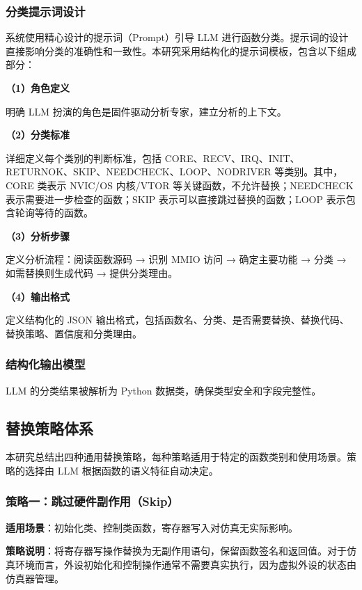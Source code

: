 \subsubsection{分类提示词设计}

系统使用精心设计的提示词（Prompt）引导 LLM 进行函数分类。提示词的设计直接影响分类的准确性和一致性。本研究采用结构化的提示词模板，包含以下组成部分：

\textbf{（1）角色定义}

明确 LLM 扮演的角色是固件驱动分析专家，建立分析的上下文。

\textbf{（2）分类标准}

详细定义每个类别的判断标准，包括 CORE、RECV、IRQ、INIT、RETURNOK、SKIP、NEEDCHECK、LOOP、NODRIVER 等类别。其中，CORE 类表示 NVIC/OS 内核/VTOR 等关键函数，不允许替换；NEEDCHECK 表示需要进一步检查的函数；SKIP 表示可以直接跳过替换的函数；LOOP 表示包含轮询等待的函数。

\textbf{（3）分析步骤}

定义分析流程：阅读函数源码 → 识别 MMIO 访问 → 确定主要功能 → 分类 → 如需替换则生成代码 → 提供分类理由。

\textbf{（4）输出格式}

定义结构化的 JSON 输出格式，包括函数名、分类、是否需要替换、替换代码、替换策略、置信度和分类理由。

\subsubsection{结构化输出模型}

LLM 的分类结果被解析为 Python 数据类，确保类型安全和字段完整性。

\subsection{替换策略体系}

本研究总结出四种通用替换策略，每种策略适用于特定的函数类别和使用场景。策略的选择由 LLM 根据函数的语义特征自动决定。

\subsubsection{策略一：跳过硬件副作用（Skip）}

\textbf{适用场景}：初始化类、控制类函数，寄存器写入对仿真无实际影响。

\textbf{策略说明}：将寄存器写操作替换为无副作用语句，保留函数签名和返回值。对于仿真环境而言，外设初始化和控制操作通常不需要真实执行，因为虚拟外设的状态由仿真器管理。


